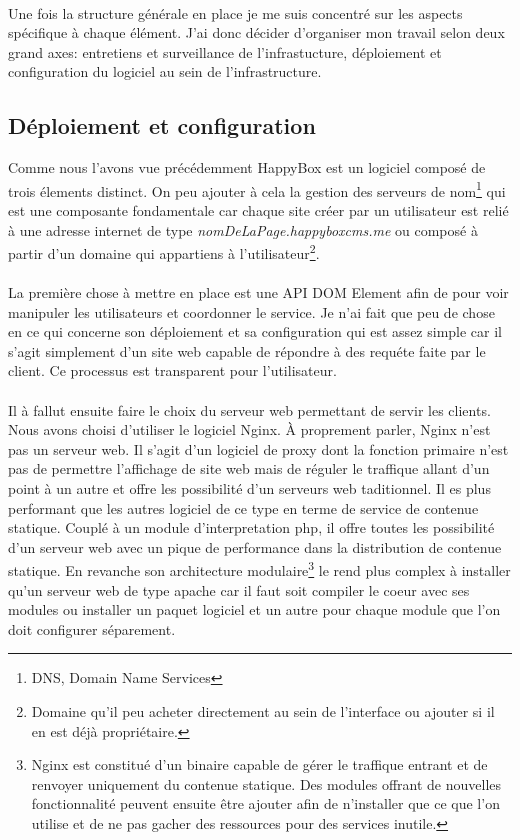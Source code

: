 \documentclass[11pt, a4paper ]{article}
\begin{document}
\begin{spacing}{1.5}
\paragraph{}
Une fois la structure générale en place je me suis concentré sur les aspects spécifique à chaque élément. 
J'ai donc décider d'organiser mon travail selon deux grand axes: entretiens et surveillance de l'infrastucture, déploiement et configuration du logiciel au sein de l'infrastructure. 

\subsection{Déploiement et configuration}

Comme nous l'avons vue précédemment HappyBox est un logiciel composé de trois élements distinct. On peu ajouter à cela la gestion des serveurs de nom\footnote{DNS, Domain Name Services} qui est une composante fondamentale car chaque site créer par un utilisateur est relié à une adresse internet de type \emph{nomDeLaPage.happyboxcms.me} ou composé à partir d'un domaine qui appartiens à l'utilisateur\footnote{Domaine qu'il peu acheter directement au sein de l'interface ou ajouter si il en est déjà propriétaire.}.
\paragraph{}
La première chose à mettre en place est une API DOM Element afin de pour voir manipuler les utilisateurs et coordonner le service. Je n'ai fait que peu de chose en ce qui concerne son déploiement et sa configuration qui est assez simple car il s'agit simplement d'un site web capable de répondre à des requéte faite par le client. Ce processus est transparent pour l'utilisateur. 
\paragraph{}
Il à fallut ensuite faire le choix du serveur web permettant de servir les clients. Nous avons choisi d'utiliser le logiciel Nginx. À proprement parler, Nginx n'est pas un serveur web. Il s'agit d'un logiciel de proxy dont la fonction primaire n'est pas de permettre l'affichage de site web mais de réguler le traffique allant d'un point à un autre et offre les possibilité d'un serveurs web taditionnel. Il es plus performant que les autres logiciel de ce type en terme de service de contenue statique. Couplé à un module d'interpretation php, il offre toutes les possibilité d'un serveur web avec un pique de performance dans la distribution de contenue statique. En revanche son architecture modulaire\footnote{Nginx est constitué d'un binaire capable de gérer le traffique entrant et de renvoyer uniquement du contenue statique. Des modules offrant de nouvelles fonctionnalité peuvent ensuite être ajouter afin de n'installer que ce que l'on utilise et de ne pas gacher des ressources pour des services inutile.} le rend plus complex à installer qu'un serveur web de type apache car il faut soit compiler le coeur avec ses modules ou installer un paquet logiciel et un autre pour chaque module que l'on doit configurer séparement.

\end{spacing}
\end{document}
